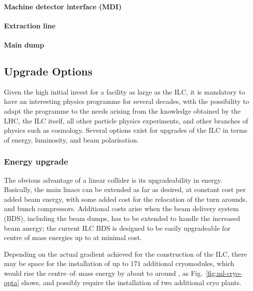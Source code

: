 \paragraph {Machine detector interface (MDI)}

\paragraph {Extraction line}

\paragraph {Main dump}


\subsection{Upgrade Options \label{subsec:upg-opt}}

Given the high initial invest for a facility as large as the ILC, it is mandatory to have an interesting physics programme for several decades, with the possibility to adapt the programme to the needs arising from the knowledge obtained by the LHC, the ILC itself, all other particle physics experiments, and other branches of physics such as cosmology.
Several options exist for upgrades of the ILC in terms of energy, luminosity, and beam polarisation.

\subsubsection{Energy upgrade}
\label{subsubsec:upg-optE}

The obvious advantage of a linear collider is its upgradeability in energy.
Basically, the main linacs can be extended as far as desired, at constant cost per added beam energy, with some added cost for the relocation of the turn arounds. and bunch compressors.
Additional costs arise when the beam delivery system (BDS), including the beam dumps, has to be extended to handle the increased beam anergy; 
the current ILC BDS is designed to be easily upgradeable for centre of mass energies up to  at minimal cost.

Depending on the actual gradient achieved for the construction of the ILC, there may be space for the installation of up to $171$ additional cryomodules, which would rise the centre--of--mass energy by about  to around , as Fig.~\ref{fig:ml-cryo-opta} shows, 
and possibly require the installation of two additional cryo plants.

